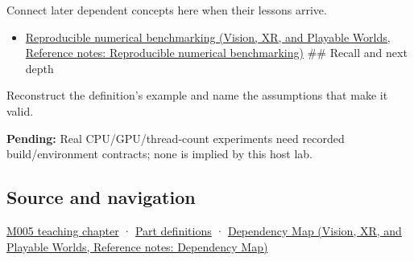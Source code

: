 Connect later dependent concepts here when their lessons arrive.

\begin{itemize}
\tightlist
\item
  \href{../07-Vision-XR-and-Playable-Worlds/main.pdf\#nameddest=appendix-b9db93e28371}{Reproducible numerical benchmarking (Vision, XR, and Playable Worlds, Reference notes: Reproducible numerical benchmarking)} \#\# Recall and next depth
\end{itemize}

Reconstruct the definition's example and name the assumptions that make it valid.

\textbf{Pending:} Real CPU/GPU/thread-count experiments need recorded build/environment contracts; none is implied by this host lab.

\subsection{Source and navigation}\label{appendix-5f1a2c3f97ff-source-and-navigation}

\hyperref[01-foundations-i-ch001-when-arithmetic-meets-uncertainty]{M005 teaching chapter} · \hyperref[appendix-fd090d982a15-m005---parts-77-88]{Part definitions} · \href{../07-Vision-XR-and-Playable-Worlds/main.pdf\#nameddest=appendix-4ad47bdd269a}{Dependency Map (Vision, XR, and Playable Worlds, Reference notes: Dependency Map)}
